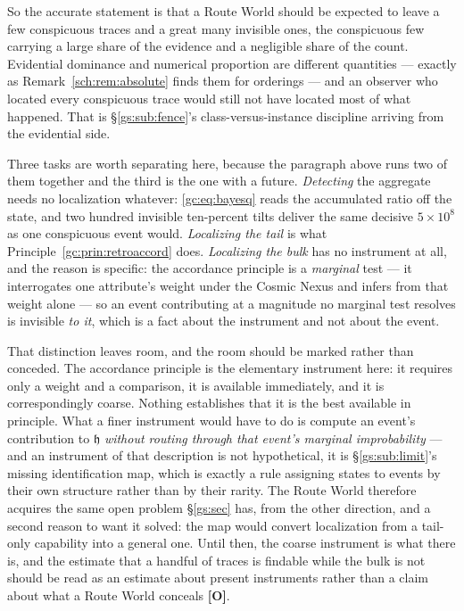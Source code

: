 \documentclass[11pt]{article}
\numberwithin{equation}{section}
\theoremstyle{plain}
\theoremstyle{definition}
\theoremstyle{remark}
\newcommand{\hm}{\mathfrak{h}}
\begin{document}
So the accurate statement is that a Route World should be expected to leave
a few conspicuous traces and a great many invisible ones, the conspicuous
few carrying a large share of the evidence and a negligible share of the
count. Evidential dominance and numerical proportion are different
quantities --- exactly as Remark~\ref{sch:rem:absolute} finds them for
orderings --- and an observer who located every conspicuous trace would
still not have located most of what happened. That is
\S\ref{gs:sub:fence}'s class-versus-instance discipline arriving from the
evidential side.

Three tasks are worth separating here, because the paragraph above runs
two of them together and the third is the one with a future.
\emph{Detecting} the aggregate needs no localization whatever:
\eqref{gc:eq:bayesq} reads the accumulated ratio off the state, and two
hundred invisible ten-percent tilts deliver the same decisive
$5\times10^{8}$ as one conspicuous event would. \emph{Localizing the
tail} is what Principle~\ref{gc:prin:retroaccord} does. \emph{Localizing
the bulk} has no instrument at all, and the reason is specific: the
accordance principle is a \emph{marginal} test --- it interrogates one
attribute's weight under the Cosmic Nexus and infers from that weight
alone --- so an event contributing at a magnitude no marginal test
resolves is invisible \emph{to it}, which is a fact about the instrument
and not about the event.

That distinction leaves room, and the room should be marked rather than
conceded. The accordance principle is the elementary instrument here: it
requires only a weight and a comparison, it is available immediately, and
it is correspondingly coarse. Nothing establishes that it is the best
available in principle. What a finer instrument would have to do is
compute an event's contribution to $\hm$ \emph{without routing through
that event's marginal improbability} --- and an instrument of that
description is not hypothetical, it is
\S\ref{gs:sub:limit}'s missing identification map, which is exactly a
rule assigning states to events by their own structure rather than by
their rarity. The Route World therefore acquires the same open problem
\S\ref{gs:sec} has, from the other direction, and a second reason to want
it solved: the map would convert localization from a tail-only
capability into a general one. Until then, the coarse instrument is what
there is, and the estimate that a handful of traces is findable while the
bulk is not should be read as an estimate about present instruments
rather than a claim about what a Route World conceals \textbf{[O]}.
\end{document}

